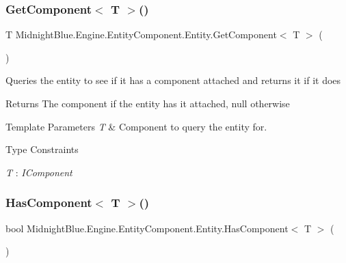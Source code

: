 \subsubsection{\texorpdfstring{Get\+Component$<$ T $>$()}{GetComponent< T >()}}
{\footnotesize\ttfamily T Midnight\+Blue.\+Engine.\+Entity\+Component.\+Entity.\+Get\+Component$<$ T $>$ (\begin{DoxyParamCaption}{ }\end{DoxyParamCaption})\hspace{0.3cm}{\ttfamily [inline]}}



Queries the entity to see if it has a component attached and returns it if it does 

\begin{DoxyReturn}{Returns}
The component if the entity has it attached, null otherwise
\end{DoxyReturn}

\begin{DoxyTemplParams}{Template Parameters}
{\em T} & Component to query the entity for.\\
\hline
\end{DoxyTemplParams}
\begin{Desc}
\item[Type Constraints]\begin{description}
\item[{\em T} : {\em I\+Component}]\end{description}
\end{Desc}
\hypertarget{class_midnight_blue_1_1_engine_1_1_entity_component_1_1_entity_a3ee2ffd693e66d08f623cb0b4279306f}{}\label{class_midnight_blue_1_1_engine_1_1_entity_component_1_1_entity_a3ee2ffd693e66d08f623cb0b4279306f} 
\subsubsection{\texorpdfstring{Has\+Component$<$ T $>$()}{HasComponent< T >()}}
{\footnotesize\ttfamily bool Midnight\+Blue.\+Engine.\+Entity\+Component.\+Entity.\+Has\+Component$<$ T $>$ (\begin{DoxyParamCaption}{ }\end{DoxyParamCaption})\hspace{0.3cm}{\ttfamily [inline]}}



